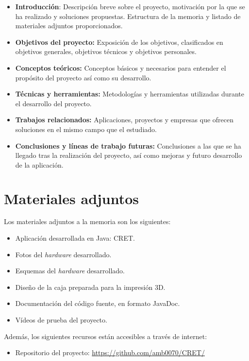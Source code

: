 \begin{itemize}

\item

\textbf{Introducción}: Descripción breve sobre el proyecto, motivación por la que se ha realizado y soluciones propuestas. Estructura de la memoria y listado de materiales adjuntos proporcionados.

\item

\textbf{Objetivos del proyecto:} Exposición de los objetivos, clasificados en objetivos generales, objetivos técnicos y objetivos personales.

\item

\textbf{Conceptos teóricos:} Conceptos básicos y necesarios para entender el propósito del proyecto así como su desarrollo.

\item

\textbf{Técnicas y herramientas:} Metodologías y herramientas utilizadas durante el desarrollo del proyecto.

\item

\textbf{Trabajos relacionados:} Aplicaciones, proyectos y empresas que ofrecen soluciones en el mismo campo que el estudiado.

\item

\textbf{Conclusiones y líneas de trabajo futuras:} Conclusiones a las que se ha llegado tras la realización del proyecto, así como mejoras  y futuro desarrollo de la aplicación.

\end{itemize}

\section{Materiales adjuntos}\label{materiales-adjuntos}

Los materiales adjuntos a la memoria son los siguientes:

\begin{itemize}

\item
	Aplicación desarrollada en Java: CRET.
\item	
	Fotos del \emph{hardware} desarrollado.
\item
	Esquemas del \emph{hardware} desarrollado.
\item
	Diseño de la caja preparada para la impresión 3D.
\item	
	Documentación del código fuente, en formato JavaDoc.
\item
	Vídeos de prueba del proyecto.
\end{itemize}

Además, los siguientes recursos están accesibles a través de internet:

\begin{itemize}
\item
  Repositorio del proyecto: \url{https://github.com/amb0070/CRET/}
\end{itemize}
